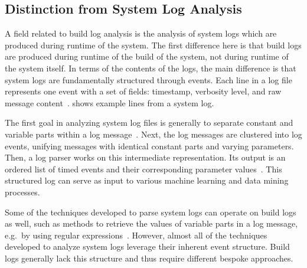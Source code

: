 \subsection{Distinction from System Log Analysis}
\label{sec:system-log-analysis}
A field related to build log analysis is the analysis of system
logs which are produced during runtime of the system.
The first difference here is that build logs are produced during runtime
of the build of the system, not during runtime of the system itself.
In terms of the contents of the logs, the main difference is that system
logs are fundamentally structured
through events.
Each line in a log file represents one event with a
set of fields: timestamp, verbosity level, and raw message
content~\cite{he2017towards}.
 shows
example lines from a system log.

The first goal in analyzing system log files is generally to
separate constant and variable parts within a log
message~\cite{nagappan2010abstracting,he2017towards}.
Next, the log
messages are clustered into log events, unifying messages with
identical constant parts and varying parameters.
Then, a log parser works on this intermediate representation.
Its output is an ordered list of timed events and their corresponding
parameter values~\cite{he2016evaluation}.
This structured log can serve as input to various machine learning and
data mining processes.

Some of the techniques developed to parse system logs can operate
on build logs as well, such as methods to retrieve the
values of variable parts in a log message, e.g.\ by using regular
expressions~\cite{nagappan2010abstracting,xu2009detecting}.
However, almost all of the techniques developed to analyze system logs
leverage their inherent event structure.
Build logs generally lack this structure and thus require different
bespoke approaches.

